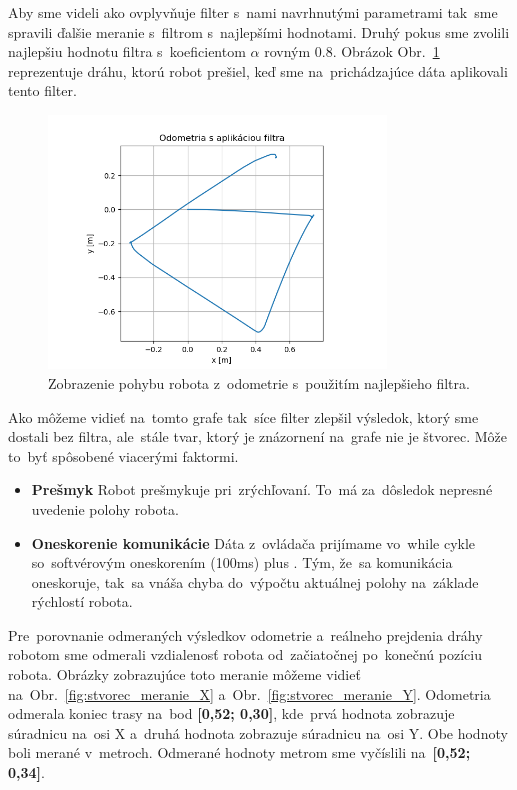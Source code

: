 Aby sme videli ako ovplyvňuje filter s~nami navrhnutými parametrami tak~sme spravili ďalšie meranie s~filtrom
s~najlepšími hodnotami. Druhý pokus sme zvolili najlepšiu hodnotu filtra s~koeficientom $\alpha$ rovným 0.8.
Obrázok Obr.~\ref{fig:stvorecSFiltrom} reprezentuje dráhu, ktorú robot prešiel, keď sme na~prichádzajúce dáta
aplikovali tento filter.

\begin{figure}[!htbp]
	\begin{center}
		\includegraphics[width=0.8\textwidth]{img/stvorec_s_filtrom_3.png}
	\end{center}
	\caption{Zobrazenie pohybu robota z~odometrie s~použitím najlepšieho filtra.}
	\label{fig:stvorecSFiltrom}
\end{figure}

Ako môžeme vidieť na~tomto grafe tak~síce filter zlepšil výsledok, ktorý sme dostali bez filtra, ale~stále tvar, ktorý
je znázornení na~grafe nie je štvorec. Môže to~byť spôsobené viacerými faktormi.

\begin{itemize}
	\item \textbf{Prešmyk} Robot prešmykuje pri~zrýchľovaní. To~má za~dôsledok nepresné uvedenie polohy robota.
	\item \textbf{Oneskorenie komunikácie} Dáta z~ovládača prijímame vo~while cykle so~softvérovým oneskorením (100ms)
		plus \cite{timovyProjekt}. Tým, že~sa komunikácia oneskoruje, tak~sa vnáša chyba do~výpočtu aktuálnej polohy
		na~základe rýchlostí robota.
\end{itemize}

Pre~porovnanie odmeraných výsledkov odometrie a~reálneho prejdenia dráhy robotom sme odmerali vzdialenosť robota
od~začiatočnej po~konečnú pozíciu robota. Obrázky zobrazujúce toto meranie môžeme vidieť
na~Obr.~\ref{fig:stvorec_meranie_X} a~Obr.~\ref{fig:stvorec_meranie_Y}.
Odometria odmerala koniec trasy na~bod \textbf{[0,52; 0,30]}, kde~prvá hodnota zobrazuje súradnicu na~osi X a~druhá hodnota
zobrazuje súradnicu na~osi Y. Obe hodnoty boli merané v~metroch. Odmerané hodnoty metrom sme vyčíslili na~\textbf{[0,52; 0,34]}.

